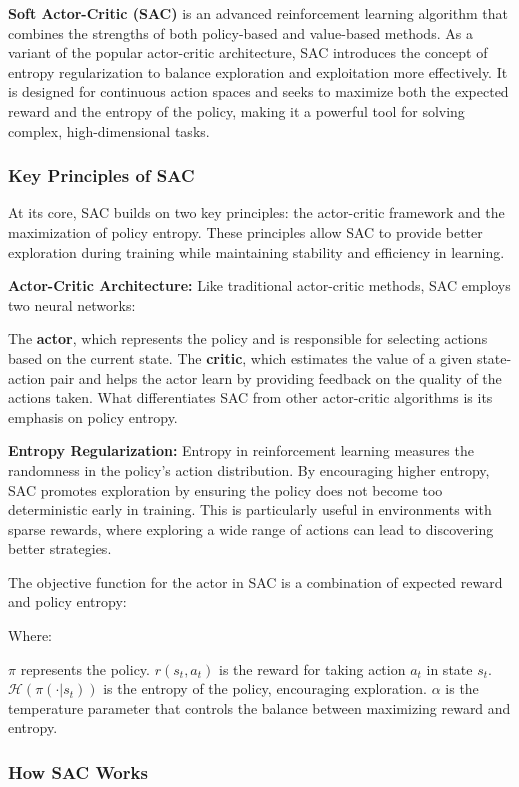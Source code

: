 \textbf{Soft Actor-Critic (SAC)} is an advanced reinforcement learning algorithm that combines the strengths of both policy-based and value-based methods. As a variant of the popular actor-critic architecture, SAC introduces the concept of entropy regularization to balance exploration and exploitation more effectively. It is designed for continuous action spaces and seeks to maximize both the expected reward and the entropy of the policy, making it a powerful tool for solving complex, high-dimensional tasks.

\subsubsection*{Key Principles of SAC}

At its core, SAC builds on two key principles: the actor-critic framework and the maximization of policy entropy. These principles allow SAC to provide better exploration during training while maintaining stability and efficiency in learning.

\textbf{Actor-Critic Architecture:} Like traditional actor-critic methods, SAC employs two neural networks:

The \textbf{actor}, which represents the policy and is responsible for selecting actions based on the current state.
The \textbf{critic}, which estimates the value of a given state-action pair and helps the actor learn by providing feedback on the quality of the actions taken.
What differentiates SAC from other actor-critic algorithms is its emphasis on policy entropy.

\textbf{Entropy Regularization:} Entropy in reinforcement learning measures the randomness in the policy’s action distribution. By encouraging higher entropy, SAC promotes exploration by ensuring the policy does not become too deterministic early in training. This is particularly useful in environments with sparse rewards, where exploring a wide range of actions can lead to discovering better strategies.

The objective function for the actor in SAC is a combination of expected reward and policy entropy:

Where:

$\pi$ represents the policy.
$r(s_t, a_t)$ is the reward for taking action $a_t$ in state $s_t$.
$\mathcal{H}(\pi(\cdot|s_t))$ is the entropy of the policy, encouraging exploration.
$\alpha$ is the temperature parameter that controls the balance between maximizing reward and entropy.
\subsubsection*{How SAC Works}

